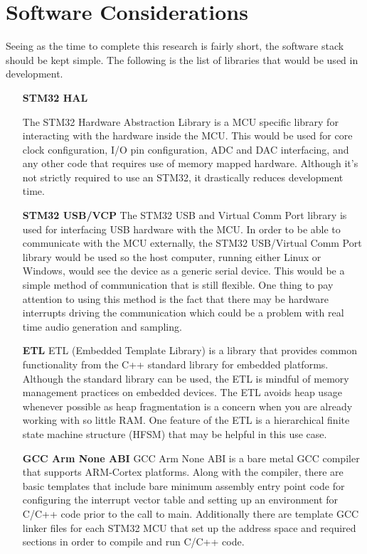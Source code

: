 \documentclass{article}[12pt,a4paper]
\begin{document}
\section*{Software Considerations}

Seeing as the time to complete this research is fairly short, the software stack should be kept simple. The following is the list of libraries that would be used in development.

\begin{itemize}
  \item[\textbf{STM32 HAL}]

  The STM32 Hardware Abstraction Library is a MCU specific library for interacting with the hardware inside the MCU. This would be used for core clock configuration, I/O pin configuration, ADC and DAC interfacing, and any other code that requires use of memory mapped hardware. Although it's not strictly required to use an STM32, it drastically reduces development time.

  
  \item[\textbf{STM32 USB/VCP}]
  The STM32 USB and Virtual Comm Port library is used for interfacing USB hardware with the MCU. In order to be able to communicate with the MCU externally, the STM32 USB/Virtual Comm Port library would be used so the host computer, running either Linux or Windows, would see the device as a generic serial device. This would be a simple method of communication that is still flexible. One thing to pay attention to using this method is the fact that there may be hardware interrupts driving the communication which could be a problem with real time audio generation and sampling.

  \item[\textbf{ETL}]
  ETL (Embedded Template Library) is a library that provides common functionality from the C++ standard library for embedded platforms. Although the standard library can be used, the ETL is mindful of memory management practices on embedded devices. The ETL avoids heap usage whenever possible as heap fragmentation is a concern when you are already working with so little RAM. One feature of the ETL is a hierarchical finite state machine structure (HFSM) that may be helpful in this use case.

  \item[\textbf{GCC Arm None ABI}]
  GCC Arm None ABI is a bare metal GCC compiler that supports ARM-Cortex platforms. Along with the compiler, there are basic templates that include bare minimum assembly entry point code for configuring the interrupt vector table and setting up an environment for C/C++ code prior to the call to main. Additionally there are template GCC linker files for each STM32 MCU that set up the address space and required sections in order to compile and run C/C++ code.


\end{itemize}
\end{document}
